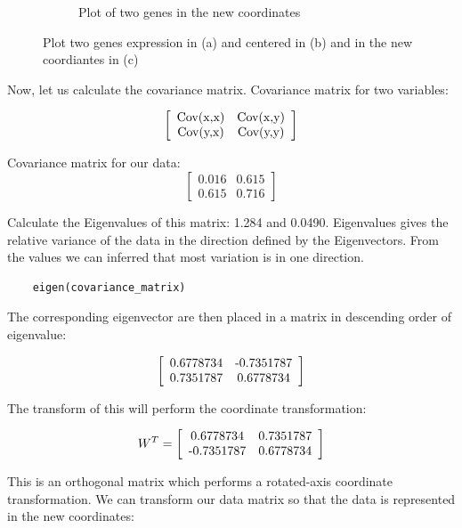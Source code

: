 \documentclass[11pt, oneside]{article}   	%
\begin{document}
\begin{figure}[!h]
\begin{subfigure}{0.45\textwidth}
		\caption{Plot of two genes in the new coordinates}
		\label{fig:PlotTwoGenesNewCoordiantes}
	\end{subfigure}
	\caption{Plot two genes expression in (a) and centered in (b) and in the new coordiantes in (c)}
	\label{fig:PlotData}
\end{figure}


Now, let us calculate the covariance matrix. Covariance matrix for two variables:

\[ \left[ \begin{array}{cc}
      $Cov(x,x)$ & $Cov(x,y)$\\ 
      $Cov(y,x)$ & $Cov(y,y)$
      \end{array} \right]
\]

Covariance matrix for our data:
\[
   \left[ \begin{array}{cc}
      0.016 & 0.615 \\ 
      0.615 & 0.716
      \end{array} \right]
\]

Calculate the Eigenvalues of this matrix:  1.284 and 0.0490. Eigenvalues gives the relative variance of the data in the direction defined by the Eigenvectors. From the values we can inferred that most variation is in one direction.

\begin{framed}
\begin{verbatim}
	eigen(covariance_matrix)
\end{verbatim}
\end{framed}

The corresponding eigenvector are then placed in a matrix in descending order of eigenvalue:

\[
   \left[ \begin{array}{cc}
	0.6778734 & $-0.7351787$ \\
	0.7351787 & 0.6778734
      \end{array} \right]
\]

The transform of this will perform the coordinate transformation:

\[
   W^T = 
   \left[ \begin{array}{cc}
	0.6778734 & 0.7351787 \\
	$-0.7351787$ & 0.6778734
      \end{array} \right]
\]

This is an orthogonal matrix which performs a rotated-axis coordinate transformation.
We can transform our data matrix so that the data is represented in the new coordinates:  
\end{document}
